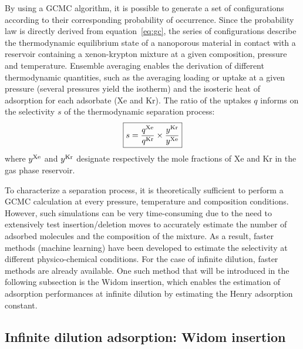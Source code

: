 \documentclass[main.tex]{subfiles}
\begin{document}
By using a GCMC algorithm, it is possible to generate a set of configurations according to their corresponding probability of occurrence. Since the probability law is directly derived from equation~\ref{eq:gc}, the series of configurations describe the thermodynamic equilibrium state of a nanoporous material in contact with a reservoir containing a xenon-krypton mixture at a given composition, pressure and temperature. Ensemble averaging enables the derivation of different thermodynamic quantities, such as the averaging loading or uptake at a given pressure (several pressures yield the isotherm) and the isosteric heat of adsorption for each adsorbate (Xe and Kr). The ratio of the uptakes $q$ informs on the selectivity $s$ of the thermodynamic separation process: 
\begin{equation}\label{eq:selec}
  \boxed{
  s = \dfrac{q^{\text{Xe}}}{q^{\text{Kr}}}\times\dfrac{y^{\text{Kr}}}{y^{\text{Xe}}}
  }
\end{equation}
where $y^{\text{Xe}}$ and $y^{\text{Kr}}$ designate respectively the mole fractions of Xe and Kr in the gas phase reservoir.

To characterize a separation process, it is theoretically sufficient to perform a GCMC calculation at every pressure, temperature and composition conditions. However, such simulations can be very time-consuming due to the need to extensively test insertion/deletion moves to accurately estimate the number of adsorbed molecules and the composition of the mixture. As a result, faster methods (machine learning) have been developed to estimate the selectivity at different physico-chemical conditions.\autocite{Simon_2015,Kang_2023} For the case of infinite dilution, faster methods are already available. One such method that will be introduced in the following subsection is the Widom insertion, which enables the estimation of adsorption performances at infinite dilution by estimating the Henry adsorption constant.


\subsection{Infinite dilution adsorption: Widom insertion}\label{sct:widom}
\end{document}
